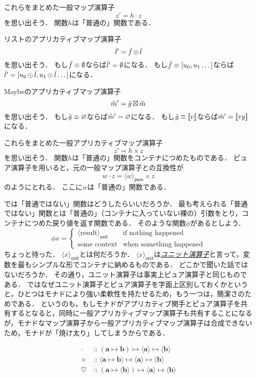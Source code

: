 \documentclass[twocolumn]{jsbook}
\def\[{[\![}
\def\]{]\!]}
\newcommand{\keyword}[1]{\underline{\emph{#1}}}
\newcommand{\hsklType}[1]{\textbf{#1}}
\DeclareMathOperator{\hsklApplicativeMap}{\times}
\DeclareMathOperator{\hsklApplicativeListMap}{\otimes}
\DeclareMathOperator{\hsklApplicativeMaybeMap}{\boxtimes}
\DeclareMathOperator{\hsklFmap}{\cdot}
\DeclareMathOperator{\hsklMap}{\odot}
\DeclareMathOperator{\hsklMonadMap}{\heartsuit}
\newcommand{\hsklEmptyList}{\emptyset}
\newcommand{\hsklNothing}{\varnothing}
\newcommand{\hsklJust}[1]{\[#1\]}
\newcommand{\hsklList}[1]{\Bar{#1}}
\newcommand{\hsklMaybe}[1]{\Tilde{#1}}
\newcommand{\hsklPure}[1]{\langle#1\rangle_\textsf{pure}}
\newcommand{\hsklUnit}[1]{\langle#1\rangle_\textsf{unit}}
\DeclareMathOperator{\mathIn}{::}
\DeclareMathOperator{\mathMapsTo}{\mapsto}
\newcommand{\mathMorph}[2]{#1\mathMapsTo#2}
\newcommand{\mathMorphII}[3]{#1\mathMapsTo#2\mathMapsTo#3}
\begin{document}
これらをまとめた一般マップ演算子$$z'=h\hsklFmap z$$を思い出そう．
関数$h$は「普通の」関数である．

リストのアプリカティブマップ演算子$$\hsklList{l}'=\hsklList{f}\hsklApplicativeListMap\hsklList{l}$$を思い出そう．
もし$\hsklList{f}\equiv\hsklEmptyList$ならば$\hsklList{l}'=\hsklEmptyList$になる．
もし$\hsklList{f}\equiv[u_0,u_1\dots]$ならば$\hsklList{l}'=[u_0\hsklMap\hsklList{l},u_1\hsklMap\hsklList{l}\dots]$になる．

Maybeのアプリカティブマップ演算子$$\hsklMaybe{m}'=\hsklMaybe{g}\hsklApplicativeMaybeMap\hsklMaybe{m}$$を思い出そう．
もし$\hsklMaybe{g}\equiv\hsklNothing$ならば$\hsklMaybe{m}'=\hsklNothing$になる．
もし$\hsklMaybe{g}\equiv\hsklJust{v}$ならば$\hsklMaybe{m}'=\hsklJust{vy}$になる．

これらをまとめた一般アプリカティブマップ演算子$$z'=h\hsklApplicativeMap z$$を思い出そう．
関数$h$は「普通の」関数をコンテナにつめたものである．
ピュア演算子を用いると，元の一般マップ演算子との互換性が$$w\hsklFmap z=\hsklPure{w}\hsklApplicativeMap z$$のようにとれる．
ここに$w$は「普通の」関数である．

では「普通ではない」関数はどうしたらいいだろうか．
最も考えられる「普通ではない」関数とは「普通の」（コンテナに入っていない裸の）引数をとり，コンテナにつめた戻り値を返す関数である．
そのような関数$\phi$があるとしよう．
$$\phi x=\begin{cases}\hsklUnit{\text{result}}&\text{if nothing happened}\\
\text{some context}&\text{when something happened}\end{cases}$$
ちょっと待った．
$\hsklUnit{x}$とは何だろうか．
$\hsklUnit{x}$は\keyword{ユニット演算子}と言って，変数を最もシンプルな形でコンテナに納めるものである．
どこかで聞いた話ではないだろうか．
その通り，ユニット演算子は事実上ピュア演算子と同じものである．
ではなぜユニット演算子とピュア演算子を字面上区別しておくかというと，ひとつはモナドにより強い柔軟性を持たせるため，もう一つは，簡潔さのためである．
というのも，もしモナドがアプリカティブ関手とピュア演算子を共有するとなると，同時に一般アプリカティブマップ演算子も共有することになるが，モナドなマップ演算子から一般アプリカティブマップ演算子は合成できないため，モナドが「焼け太り」してしまうからである．

\begin{align*}
\hsklFmap&\mathIn{}\mathMorphII{(\mathMorph{\hsklType{a}}{\hsklType{b}})}{\langle\hsklType{a}\rangle}{\langle\hsklType{b}
\rangle}\\
\hsklApplicativeMap&\mathIn{}\mathMorphII{\langle\mathMorph{\hsklType{a}}{\hsklType{b}}\rangle}{\langle\hsklType{a}\rangle}{\langle\hsklType{b}\rangle}\\
\hsklMonadMap&\mathIn{}\mathMorphII{(\mathMorph{\hsklType{a}}{\langle\hsklType{b}\rangle})}{\langle\hsklType{a}\rangle}{\langle{\hsklType{b}}\rangle}
\end{align*}
\end{document}

